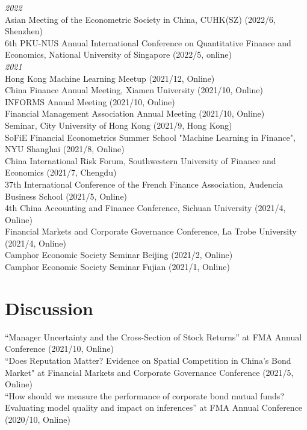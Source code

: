 \documentclass[margin]{res}
\begin{document}
\begin{resume}
\textit{2022} \\
Asian Meeting of the Econometric Society in China, CUHK(SZ) (2022/6, Shenzhen) \\
6th PKU-NUS Annual International Conference on Quantitative Finance and Economics, National University of Singapore (2022/5, online) \\

\textit{2021} \\
Hong Kong Machine Learning Meetup (2021/12, Online) \\
China Finance Annual Meeting, Xiamen University (2021/10, Online) \\
INFORMS Annual Meeting (2021/10, Online) \\
Financial Management Association Annual Meeting (2021/10, Online) \\
Seminar, City University of Hong Kong (2021/9, Hong Kong) \\
SoFiE Financial Econometrics Summer School "Machine Learning in Finance", NYU Shanghai (2021/8, Online) \\
China International Risk Forum, Southwestern University of Finance and Economics  (2021/7, Chengdu) \\
37th International Conference of the French Finance Association, Audencia Business School (2021/5, Online) \\
4th China Accounting and Finance Conference, Sichuan University (2021/4, Online) \\
Financial Markets and Corporate Governance Conference, La Trobe University (2021/4, Online) \\
Camphor Economic Society Seminar Beijing (2021/2, Online) \\
Camphor Economic Society Seminar Fujian (2021/1, Online)\\


\section{\sc Discussion}

``Manager Uncertainty and the Cross-Section of Stock Returns'' at FMA Annual Conference (2021/10, Online)
\\
``Does Reputation Matter? Evidence on Spatial Competition in China’s Bond Market" at Financial Markets and Corporate Governance Conference (2021/5, Online)
\\
``How should we measure the performance of corporate bond mutual funds? Evaluating model quality and impact on inferences'' at FMA Annual Conference (2020/10, Online)
\\



\end{resume}
\end{document}
